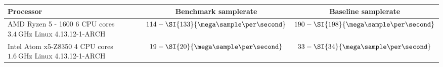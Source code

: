 \begin{tabular}{| l | c | c |}
  \hline
  Processor & Benchmark samplerate & Baseline samplerate \\

  \hline
  \parbox[c]{5cm}{\vspace{1mm} AMD Ryzen 5 - 1600 \\ 6 CPU cores \\ $\SI{3.4}{\giga\hertz}$ \\ Linux 4.13.12-1-ARCH \vspace{1mm}} &
  \parbox[c]{5cm}{\centering $114 - \SI{133}{\mega\sample\per\second}$} &
  \parbox[c]{5cm}{\centering $190 - \SI{198}{\mega\sample\per\second}$} \\

  \hline
  \parbox[c]{5cm}{\vspace{1mm} Intel Atom x5-Z8350 \\ 4 CPU cores \\ $\SI{1.6}{\giga\hertz}$ \\ Linux 4.13.12-1-ARCH \vspace{1mm}} &
  \parbox[c]{5cm}{\centering $19 - \SI{20}{\mega\sample\per\second}$} &
  \parbox[c]{5cm}{\centering $33 - \SI{34}{\mega\sample\per\second}$} \\

  \hline
\end{tabular}
